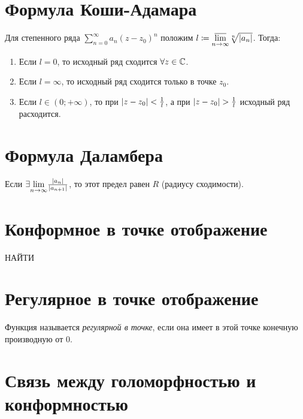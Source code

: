 \section{Формула Коши-Адамара}

\begin{theorem}
	Для степенного ряда $\sum_{n=0}^{\infty}a_n(z-z_0)^n$ положим $l\coloneq \underset{n \rightarrow \infty}{\overline{\lim}}\sqrt[n]{\left\lvert a_n\right\rvert}$. Тогда:
	\begin{enumerate}
		\item Если $l=0$, то исходный ряд сходится $\forall z \in \mathbb{C}$.
		\item Если $l = \infty$, то исходный ряд сходится только в точке $z_0$.
		\item Если $l \in (0 ; +\infty)$, то при $\left\lvert z-z_0\right\rvert < \frac{1}{l}$, а при $\left\lvert z-z_0\right\rvert > \frac{1}{l}$ исходный ряд расходится.
	\end{enumerate}
\end{theorem}

\section{Формула Даламбера}

\begin{remark}
	Если $\exists \underset{n \rightarrow \infty}{\lim}\frac{\left\lvert a_n\right\rvert}{\left\lvert a_{n+1}\right\rvert}$, то этот предел равен $R$ (радиусу сходимости).
\end{remark}

\section{Конформное в точке отображение}

 {\huge НАЙТИ}

\section{Регулярное в точке отображение}

\begin{definition}
	Функция называется \emph{регулярной в точке}, если она имеет в этой точке конечную производную от $0$.
\end{definition}

\section{Связь между голоморфностью и конформностью}

